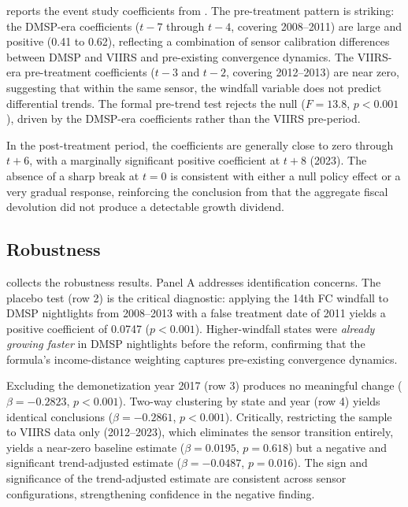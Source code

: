 \documentclass[12pt]{article}
\begin{document}
 reports the event study coefficients from . The pre-treatment pattern is striking: the DMSP-era coefficients ($t-7$ through $t-4$, covering 2008--2011) are large and positive (0.41 to 0.62), reflecting a combination of sensor calibration differences between DMSP and VIIRS and pre-existing convergence dynamics. The VIIRS-era pre-treatment coefficients ($t-3$ and $t-2$, covering 2012--2013) are near zero, suggesting that within the same sensor, the windfall variable does not predict differential trends. The formal pre-trend test rejects the null ($F = 13.8$, $p < 0.001$), driven by the DMSP-era coefficients rather than the VIIRS pre-period.

In the post-treatment period, the coefficients are generally close to zero through $t + 6$, with a marginally significant positive coefficient at $t + 8$ (2023). The absence of a sharp break at $t = 0$ is consistent with either a null policy effect or a very gradual response, reinforcing the conclusion from  that the aggregate fiscal devolution did not produce a detectable growth dividend.



\subsection{Robustness}

 collects the robustness results. Panel A addresses identification concerns. The placebo test (row 2) is the critical diagnostic: applying the 14th FC windfall to DMSP nightlights from 2008--2013 with a false treatment date of 2011 yields a positive coefficient of 0.0747 ($p < 0.001$). Higher-windfall states were \emph{already growing faster} in DMSP nightlights before the reform, confirming that the formula's income-distance weighting captures pre-existing convergence dynamics.

Excluding the demonetization year 2017 (row 3) produces no meaningful change ($\beta = -0.2823$, $p < 0.001$). Two-way clustering by state and year (row 4) yields identical conclusions ($\beta = -0.2861$, $p < 0.001$). Critically, restricting the sample to VIIRS data only (2012--2023), which eliminates the sensor transition entirely, yields a near-zero baseline estimate ($\beta = 0.0195$, $p = 0.618$) but a negative and significant trend-adjusted estimate ($\beta = -0.0487$, $p = 0.016$). The sign and significance of the trend-adjusted estimate are consistent across sensor configurations, strengthening confidence in the negative finding.
\end{document}
